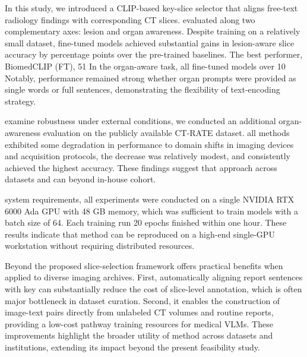 \documentclass[bioengineering,article,submit,pdftex,moreauthors]{Definitions/mdpi}
\begin{document}
In this study, we introduced a CLIP-based key-slice selector that aligns free-text radiology findings with corresponding CT slices. 
 evaluated along two complementary axes: lesion and organ awareness. 
Despite training on a relatively small dataset, fine-tuned models achieved substantial gains in lesion-aware slice  accuracy by  percentage points over the pre-trained baselines. 
The best performer, BiomedCLIP (FT),  51%
In the organ-aware task, all fine-tuned models  over 10 %
Notably, performance remained strong whether organ prompts were provided as single words or full sentences, demonstrating the flexibility of  text-encoding strategy. 

    examine robustness under external conditions, we conducted an additional organ-awareness evaluation on the publicly available CT-RATE dataset. 
   all methods exhibited some degradation in performance  to domain shifts in imaging devices and acquisition protocols, the decrease was relatively modest, and  consistently achieved the highest accuracy. 
  These findings suggest that  approach   across datasets and can  beyond  in-house cohort.



   system requirements, all experiments were conducted on a single NVIDIA RTX 6000 Ada GPU with 48 GB memory, which was sufficient to train models with a batch size of 64. 
  Each training run  20 epochs finished within one hour. 
  These results indicate that  method can be reproduced on a high-end single-GPU workstation without requiring distributed resources.



  Beyond    the proposed slice-selection framework offers practical benefits when applied to diverse imaging archives. 
  First, automatically aligning report sentences with key  can substantially reduce the cost of  slice-level annotation, which is often  major bottleneck in dataset curation. 
  Second, it enables the construction of image-text pairs directly from unlabeled CT volumes and routine reports, providing a low-cost pathway   training resources for medical VLMs. 
  These improvements highlight the broader utility of  method across datasets and institutions, extending its impact beyond the present feasibility study.
\end{document}
